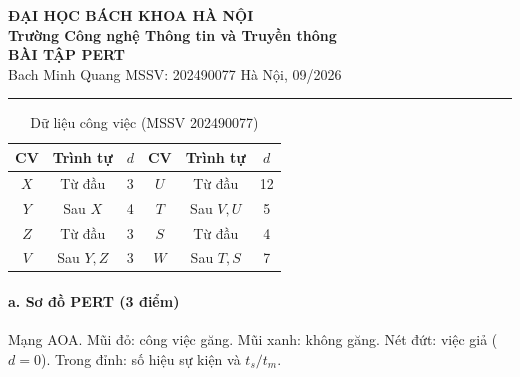 \documentclass[12pt,a4paper]{article}
\begin{document}
\begin{center}
  {\large\bfseries ĐẠI HỌC BÁCH KHOA HÀ NỘI}\\[0.5pt]
  {\bfseries Trường Công nghệ Thông tin và Truyền thông}\\[4pt]
  {\Large\bfseries BÀI TẬP PERT}\\[1pt]
  {\small Bach Minh Quang \quad MSSV: 202490077 \quad Hà Nội, 09/2026}
\end{center}
\vspace{-3pt}
\hrule
\vspace{6pt}

\begin{table}[H]\centering
\caption{Dữ liệu công việc (MSSV 202490077)}
\small
\begin{tabular}{cccccc}
\toprule
\textbf{CV} & \textbf{Trình tự} & \textbf{$d$} & \textbf{CV} & \textbf{Trình tự} & \textbf{$d$}\\
\midrule
$X$ & Từ đầu & 3 & $U$ & Từ đầu & 12\\
$Y$ & Sau $X$ & 4 & $T$ & Sau $V,U$ & 5\\
$Z$ & Từ đầu & 3 & $S$ & Từ đầu & 4\\
$V$ & Sau $Y,Z$ & 3 & $W$ & Sau $T,S$ & 7\\
\bottomrule
\end{tabular}
\end{table}

\paragraph{a. Sơ đồ PERT \hfill {\normalfont\small (3 điểm)}}
Mạng AOA. Mũi đỏ: công việc găng. Mũi xanh: không găng. Nét đứt: việc giả ($d=0$).
Trong đỉnh: số hiệu sự kiện và $t_s/t_m$.
\end{document}
